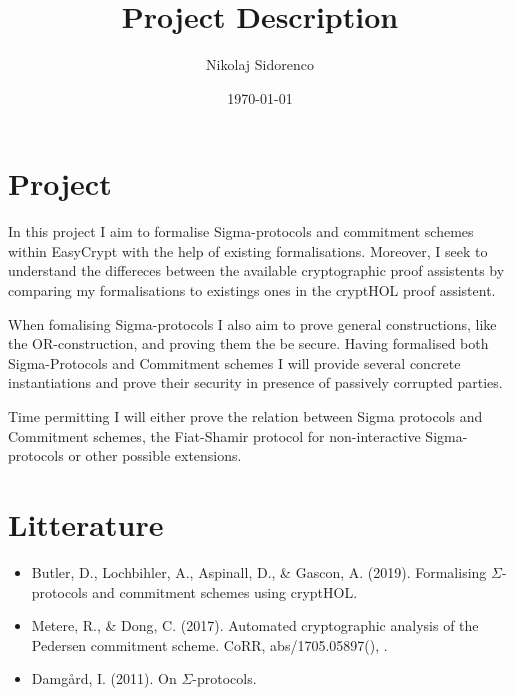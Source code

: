 \documentclass[11pt]{article}
\author{Nikolaj Sidorenco}
\date{\today}
\title{Project Description}
\begin{document}
\maketitle

\section{Project}
\label{sec:org9c2bfa8}

In this project I aim to formalise Sigma-protocols and commitment schemes within
EasyCrypt with the help of existing formalisations.
Moreover, I seek to understand the differeces between the available
cryptographic proof assistents by comparing my formalisations to existings ones
in the cryptHOL proof assistent.


When fomalising Sigma-protocols I also aim to prove general constructions, like
the OR-construction, and proving them the be secure. Having formalised both
Sigma-Protocols and Commitment schemes I will provide several concrete instantiations
and prove their security in presence of passively corrupted parties.


Time permitting I will either prove the relation between Sigma protocols and
Commitment schemes, the Fiat-Shamir protocol for non-interactive Sigma-protocols
or other possible extensions.


\section{Litterature}
\label{sec:org23981b6}
\begin{itemize}
\item Butler, D., Lochbihler, A., Aspinall, D., \& Gascon, A. (2019). Formalising
\(\Sigma\)-protocols and commitment schemes using cryptHOL.
\item Metere, R., \& Dong, C. (2017). Automated cryptographic analysis of the
Pedersen commitment scheme. CoRR, abs/1705.05897(), .
\item Damgård, I. (2011). On \(\Sigma\)-protocols.
\end{itemize}
\end{document}
